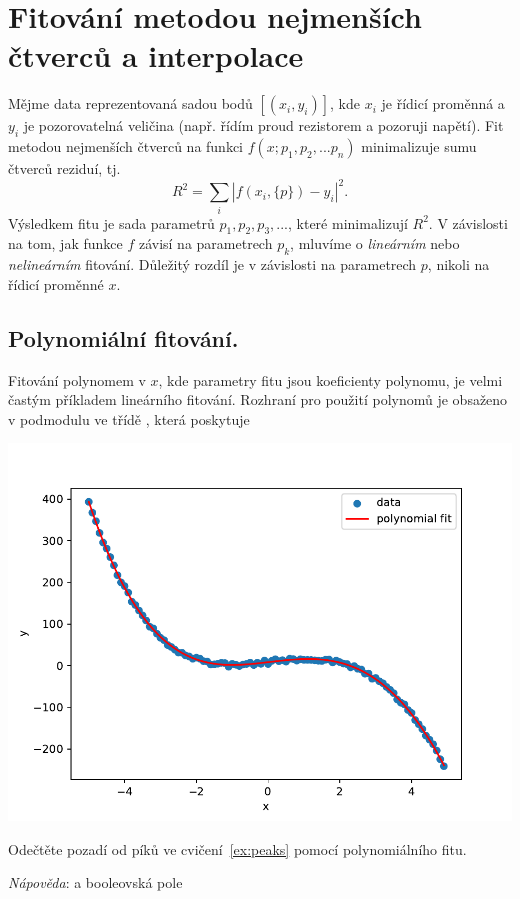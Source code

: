 \newpage
\section{Fitování metodou nejmenších čtverců a interpolace}
Mějme data reprezentovaná sadou bodů $[(x_i, y_i)]$, kde $x_i$ je řídicí proměnná a $y_i$ je pozorovatelná veličina (např. řídím proud rezistorem a pozoruji napětí). Fit metodou nejmenších čtverců na funkci $f(x; p_1, p_2, ... p_n)$ minimalizuje sumu čtverců reziduí, tj.
\begin{equation}
    R^2 = \sum_i \left|f(x_i, \{p\}) - y_i\right|^2.
\end{equation}
Výsledkem fitu je sada parametrů $p_1, p_2, p_3, ...$, které minimalizují $R^2$. V závislosti na tom, jak funkce $f$ závisí na parametrech $p_k$, mluvíme o \emph{lineárním} nebo \emph{nelineárním} fitování. Důležitý rozdíl je v závislosti na parametrech $p$, nikoli na řídicí proměnné $x$.


\subsection{Polynomiální fitování.}
Fitování polynomem v $x$, kde parametry fitu jsou koeficienty polynomu, je velmi častým příkladem lineárního fitování. Rozhraní pro použití polynomů je obsaženo v podmodulu  ve třídě , která poskytuje


\begin{center}
    \includegraphics[width=0.5\linewidth]{polynomial_fit.pdf}
\end{center}

\begin{exercise}
    Odečtěte pozadí od píků ve cvičení~\ref{ex:peaks} pomocí polynomiálního fitu.

    \emph{Nápověda}:  a booleovská pole
\end{exercise}

